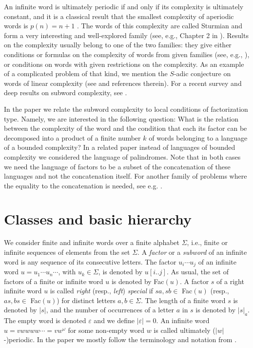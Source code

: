 \documentclass[runningheads,envcountsect,envcountsame]{llncs}
\begin{document}
An infinite word is ultimately periodic if and only if its complexity is ultimately constant, and it is a classical result that the smallest complexity of aperiodic words is $p(n) = n +
1$ \cite{MoHe1}. The words of this complexity are called Sturmian and form a very interesting and well-explored family (see, e.g., Chapter 2 in \cite{Lo}). Results on the complexity usually belong to one of the two families: they give either conditions or formulas on the complexity of words from given families (see, e.g., \cite{pansiot}), or conditions on words with given restrictions on the complexity. As an example of a complicated problem of that kind, we mention the $S$-adic conjecture on words of linear complexity (see \cite{leroy} and references therein). For a recent survey and deep results on subword complexity, see \cite{cas_livre}.

In the paper we relate the subword complexity to local conditions of factorization type.
Namely, we are interested in the following question: What is the relation between the complexity of the word and the condition that each its factor can be decomposed into a product of a finite number $k$ of words belonging to a language of a bounded complexity? In a related paper \cite{fpz} instead of languages of bounded complexity we considered the language of palindromes. 
Note that in both cases we need the language of factors to be a subset of the concatenation of these languages and not the concatenation itself. For another family of problems where the equality to the concatenation is needed, see e.g. \cite{af,hsw}.

\section{Classes and basic hierarchy}

We consider finite and infinite words over a finite alphabet
$\Sigma$, i.e., finite or infinite sequences of elements from the set $\Sigma$. A \emph{factor} or a \emph{subword} of an infinite word
is any sequence of its consecutive letters. The factor
$u_{i}\cdots u_j$ of an infinite word $u=u_1\cdots u_n \cdots$,
with $u_k \in \Sigma$, is denoted by $u[i..j]$. As usual, the set
of factors of a finite or infinite word $u$ is denoted by
Fac$(u)$. A factor $s$ of a right infinite word $u$ is called
\emph{right} (resp., \emph{left}) \emph{special} if $sa,sb \in$
Fac$(u)$ (resp., $as,bs \in$ Fac$(u)$) for distinct letters $a,b
\in \Sigma$.  The length of a finite word $s$ is denoted by $|s|$,
and the number of occurrences of a letter $a$ in $s$ is denoted by
$|s|_a$. The empty word is denoted $\varepsilon$ and we define
$|\varepsilon|=0$. An infinite word $u=vwwww\cdots = vw^{\omega}$ for some non-empty word $w$ is called ultimately ($|w|$-)periodic. In the paper we mostly follow the terminology and notation from \cite{Lo}.
\end{document}
